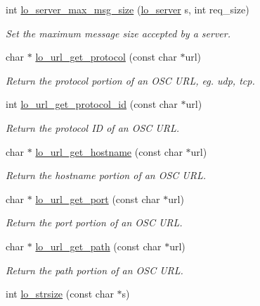 \begin{DoxyCompactItemize}
int \hyperlink{group__liblolowlevel_ga9474e6c57e59bd99fd92d0fc8cbe3b88}{lo\+\_\+server\+\_\+max\+\_\+msg\+\_\+size} (\hyperlink{lo__types_8h_a59067bf50cf8abb4371da6f03c9036c9}{lo\+\_\+server} s, int req\+\_\+size)
\begin{DoxyCompactList}\small\item\em Set the maximum message size accepted by a server. \end{DoxyCompactList}\item 
char $\ast$ \hyperlink{group__liblolowlevel_ga58266d3085b73fc4dc5e1913de810b22}{lo\+\_\+url\+\_\+get\+\_\+protocol} (const char $\ast$url)
\begin{DoxyCompactList}\small\item\em Return the protocol portion of an O\+S\+C U\+R\+L, eg. udp, tcp. \end{DoxyCompactList}\item 
int \hyperlink{group__liblolowlevel_ga0550cc91417b530c26a360b10072a3cb}{lo\+\_\+url\+\_\+get\+\_\+protocol\+\_\+id} (const char $\ast$url)
\begin{DoxyCompactList}\small\item\em Return the protocol I\+D of an O\+S\+C U\+R\+L. \end{DoxyCompactList}\item 
char $\ast$ \hyperlink{group__liblolowlevel_gab1b7df7061a0b2cd0db31d3fca1b399b}{lo\+\_\+url\+\_\+get\+\_\+hostname} (const char $\ast$url)
\begin{DoxyCompactList}\small\item\em Return the hostname portion of an O\+S\+C U\+R\+L. \end{DoxyCompactList}\item 
char $\ast$ \hyperlink{group__liblolowlevel_ga488fb8e96fb86320590c1a8ca389593d}{lo\+\_\+url\+\_\+get\+\_\+port} (const char $\ast$url)
\begin{DoxyCompactList}\small\item\em Return the port portion of an O\+S\+C U\+R\+L. \end{DoxyCompactList}\item 
char $\ast$ \hyperlink{group__liblolowlevel_ga617d046cc702a2c5ab8539659381ef18}{lo\+\_\+url\+\_\+get\+\_\+path} (const char $\ast$url)
\begin{DoxyCompactList}\small\item\em Return the path portion of an O\+S\+C U\+R\+L. \end{DoxyCompactList}\item 
int \hyperlink{group__liblolowlevel_gae62aa870bad161e4507f6338820ac243}{lo\+\_\+strsize} (const char $\ast$s)

\end{DoxyCompactItemize}
